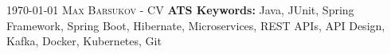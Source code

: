 
\makecvfooterwithkeywords
   {\textsc{\monthyeardate\today}}
   {\textsc{Max Barsukov - CV}}
   {\thepage}
   {\textbf{ATS Keywords:} Java, JUnit, Spring Framework, Spring Boot, Hibernate,
                           Microservices, REST APIs, API Design, Kafka, Docker, Kubernetes, Git}
